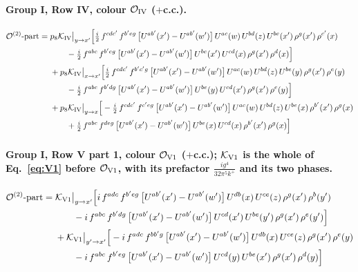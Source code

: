 \documentclass[10pt]{article}
\numberwithin{equation}{section}
\newcommand{\OO}{\mathcal O}
\newcommand{\KK}{\mathcal K}
\begin{document}
\paragraph{Group I, Row IV, colour $\OO_{\rm IV}$ ($+$c.c.).}
\begin{align}
\OO^{(2)}\text{-part}={}&p_8\KK_{\rm IV}\big|_{y\to x'}\Big[\tfrac{i}{2}\,f^{cdc'}\,f^{b'eg}\,\big[U^{ab'}(x')-U^{ab'}(w')\big]\,U^{ac}(w)\,U^{bd}(z)\,U^{be}(x')\,\rho^{g}(x')\,\rho^{c'}(x)\notag\\
&\qquad-\tfrac{i}{2}\,f^{abc}\,f^{b'eg}\,\big[U^{ab'}(x')-U^{ab'}(w')\big]\,U^{be}(x')\,U^{cd}(x)\,\rho^{g}(x')\,\rho^{d}(x)\Big]\notag\\
&+p_8\KK_{\rm IV}\big|_{x\to x'}\Big[\tfrac{i}{2}\,f^{cdc'}\,f^{b'c'g}\,\big[U^{ab'}(x')-U^{ab'}(w')\big]\,U^{ac}(w)\,U^{bd}(z)\,U^{be}(y)\,\rho^{g}(x')\,\rho^{e}(y)\notag\\
&\qquad-\tfrac{i}{2}\,f^{abc}\,f^{b'dg}\,\big[U^{ab'}(x')-U^{ab'}(w')\big]\,U^{be}(y)\,U^{cd}(x')\,\rho^{g}(x')\,\rho^{e}(y)\Big]\notag\\
&+p_8\KK_{\rm IV}\big|_{y\to x}\Big[-\tfrac{i}{2}\,f^{cdc'}\,f^{c'eg}\,\big[U^{ab'}(x')-U^{ab'}(w')\big]\,U^{ac}(w)\,U^{bd}(z)\,U^{be}(x)\,\rho^{b'}(x')\,\rho^{g}(x)\notag\\
&\qquad+\tfrac{i}{2}\,f^{abc}\,f^{deg}\,\big[U^{ab'}(x')-U^{ab'}(w')\big]\,U^{be}(x)\,U^{cd}(x)\,\rho^{b'}(x')\,\rho^{g}(x)\Big]
\end{align}
\paragraph{Group I, Row V part 1, colour $\OO_{\rm V1}$ ($+$c.c.); $\KK_{\rm V1}$ is the whole of Eq.~\eqref{eq:V1} before $\OO_{\rm V1}$, with its prefactor $\frac{ig^4}{32\pi^5k^+}$ and its two phases.}
\begin{align}
\OO^{(2)}\text{-part}={}&\KK_{\rm V1}\big|_{y\to x'}\Big[i\,f^{adc}\,f^{b'eg}\,\big[U^{ab'}(x')-U^{ab'}(w')\big]\,U^{db}(x)\,U^{ce}(z)\,\rho^{g}(x')\,\rho^{b}(y')\notag\\
&\qquad-i\,f^{abc}\,f^{b'dg}\,\big[U^{ab'}(x')-U^{ab'}(w')\big]\,U^{cd}(x')\,U^{be}(y')\,\rho^{g}(x')\,\rho^{e}(y')\Big]\notag\\
&+\KK_{\rm V1}\big|_{y'\to x'}\Big[-i\,f^{adc}\,f^{bb'g}\,\big[U^{ab'}(x')-U^{ab'}(w')\big]\,U^{db}(x)\,U^{ce}(z)\,\rho^{g}(x')\,\rho^{e}(y)\notag\\
&\qquad-i\,f^{abc}\,f^{b'eg}\,\big[U^{ab'}(x')-U^{ab'}(w')\big]\,U^{cd}(y)\,U^{be}(x')\,\rho^{g}(x')\,\rho^{d}(y)\Big]
\end{align}
\end{document}

